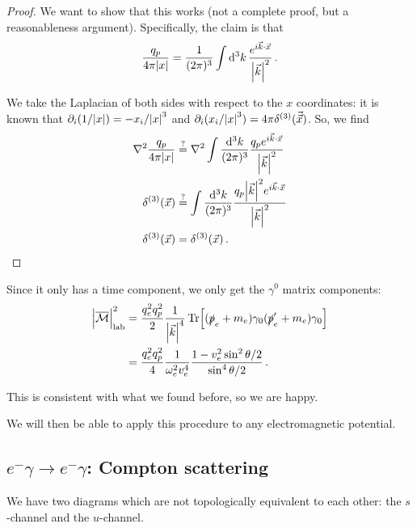 \documentclass[main.tex]{subfiles}
\begin{document}
\begin{proof}
We want to show that this works (not a complete proof, but a reasonableness argument). Specifically, the claim is that 
%
\begin{align}
\frac{q_p}{4 \pi \abs{x}} = \frac{1}{(2 \pi )^3} \int \dd[3]{k} \frac{e^{i \vec{k} \cdot \vec{x}}}{\abs{\vec{k}}^2}
\,.
\end{align}

We take the Laplacian of both sides with respect to the \(x\) coordinates: it is known that \(\partial_{i} (1/ \abs{x}) = - x_i / \abs{x}^3\) and \(\partial_{i} (x_i / \abs{x}^3) = 4 \pi \delta^{(3)} (\vec{\vec{x}})\). So, we find 
%
\begin{align}
\nabla^2 \frac{q_p}{4 \pi \abs{x}} &\overset{?}{=}
\nabla^2 \int \frac{ \dd[3]{k}}{(2 \pi )^3}
\frac{q_p e^{i \vec{k} \cdot \vec{x}}}{\abs{\vec{k}}^2}  \\
\delta^{(3)}(\vec{x}) &\overset{?}{=}
\int \frac{ \dd[3]{k}}{(2 \pi )^3}
\frac{q_p \abs{\vec{k}}^2 e^{i \vec{k} \cdot \vec{x}}}{\abs{\vec{k}}^2}  \\
\delta^{(3)} (\vec{x}) &= \delta^{(3)}(\vec{x}) 
\,.
\end{align}
\end{proof}

Since it only has a time component, we only get the \(\gamma^{0}\) matrix components: 
%
\begin{align}
\abs{\mathcal{\overline{M}}}^2 _{\text{lab}} 
&= \frac{q_e^2 q_p^2}{2} 
\frac{1}{\abs{\vec{k}}^4} 
\Tr[(\slashed{p}_e + m_e) \gamma_{0} (\slashed{p}_e' + m_e) \gamma_{0}]  \\
&= \frac{q_e^2 q_p^2}{4} \frac{1}{\omega_{e}^2 v_e^4} \frac{1 - v_e^2 \sin^2 \theta/2}{\sin^{4} \theta /2} 
\,.
\end{align}

This is consistent with what we found before, so we are happy. 

We will then be able to apply this procedure to any electromagnetic potential. 

\subsection{\(e^{-} \gamma \to e^{-} \gamma \): Compton scattering}

We have two diagrams which are not topologically equivalent to each other: the \(s\)-channel and the \(u\)-channel. 
\end{document}
